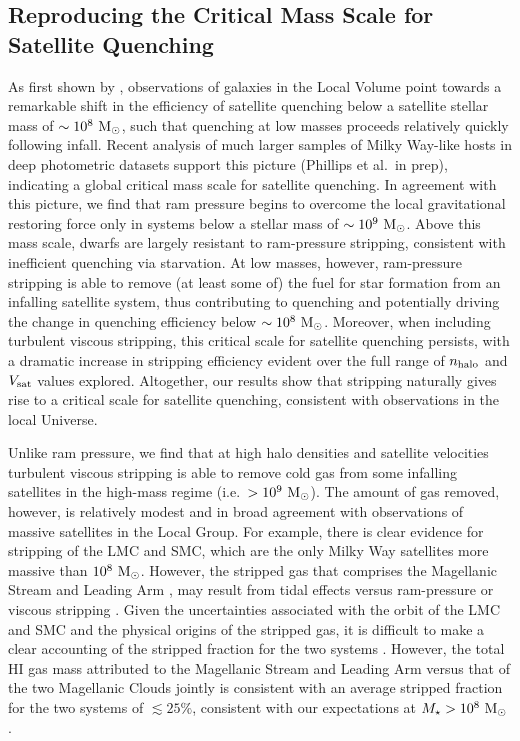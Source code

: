 \documentclass[usenatbib]{mn2e}
\newcommand{\mstar}{{M}_{\star}}
\newcommand{\msun}{{\rm M}_{\odot}}
\begin{document}
\subsection{Reproducing the Critical Mass Scale for Satellite Quenching}
\label{subsec:critmass}

As first shown by \citet[][see also \citealt{slater14,
  phillips15a}]{wheeler14}, observations of galaxies in the Local
Volume point towards a remarkable shift in the efficiency of satellite
quenching below a satellite stellar mass of $\sim10^{8}~\msun$, such
that quenching at low masses proceeds relatively quickly following
infall.
%
Recent analysis of much larger samples of Milky Way-like hosts in deep
photometric datasets support this picture (Phillips et al.~in prep),
indicating a global critical mass scale for satellite quenching.
%
In agreement with this picture, we find that ram pressure begins to
overcome the local gravitational restoring force only in systems below
a stellar mass of $\sim10^{9}~\msun$.
%
Above this mass scale, dwarfs are largely resistant to ram-pressure
stripping, consistent with inefficient quenching via starvation.
%
At low masses, however, ram-pressure stripping is able to remove (at
least some of) the fuel for star formation from an infalling satellite
system, thus contributing to quenching and potentially driving the
change in quenching efficiency below $\sim10^{8}~\msun$.
%
Moreover, when including turbulent viscous stripping, this critical
scale for satellite quenching persists, with a dramatic increase in
stripping efficiency evident over the full range of $n_{\rm halo}$ and
$V_{\rm sat}$ values explored. 
%
Altogether, our results show that stripping naturally gives rise to a
critical scale for satellite quenching, consistent with observations
in the local Universe.


Unlike ram pressure, we find that at high halo densities and satellite
velocities turbulent viscous stripping is able to remove cold gas from
some infalling satellites in the high-mass regime
(i.e.~$>10^{9}~\msun$). 
%
The amount of gas removed, however, is relatively modest and in broad
agreement with observations of massive satellites in the Local Group.
%
For example, there is clear evidence for stripping of the LMC and SMC,
which are the only Milky Way satellites more massive than
$10^{8}~\msun$. However, the stripped gas that comprises the
Magellanic Stream and Leading Arm \citep{mathewson74}, may result from
tidal effects \citep[e.g.][]{lin77, besla10, besla12, guglielmo14}
versus ram-pressure or viscous stripping \citep[e.g.][]{md94,
  mastropietro05, salem15, hammer15}.
%
Given the uncertainties associated with the orbit of the LMC and SMC
and the physical origins of the stripped gas, it is difficult to make
a clear accounting of the stripped fraction for the two systems 
\citep[e.g.][]{donghia15}. However, the total H{\scriptsize I} gas
mass attributed to the Magellanic Stream and Leading Arm versus that
of the two Magellanic Clouds jointly is consistent with an average
stripped fraction for the two systems of $\lesssim25\%$, consistent
with our expectations at $\mstar>10^{8}~\msun$ \citep[see
Fig.~\ref{fig:MW_KH},][]{bruns05, nidever08, nidever10}.
\end{document}
